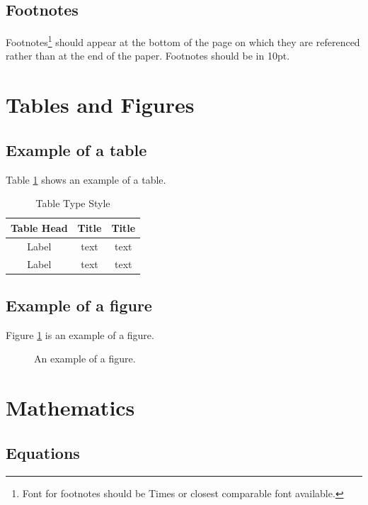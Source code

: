 \documentclass[12pt]{article}
\begin{document}
\subsection{Footnotes}

Footnotes\footnote{Font for footnotes should be Times or closest comparable font available.}
should appear at the bottom of the page on which they are referenced rather than at the end of the paper. Footnotes should be in 10pt.

\section{Tables and Figures}

\subsection{Example of a table}

Table \ref{tab1} shows an example of a table.

\begin{table}[h]
\caption{Table Type Style}
\centering
\begin{tabular}{ccc}
\hline
Table Head & Title & Title \\
\hline
Label & text & text \\
Label & text & text \\
\hline
\end{tabular}
\label{tab1}
\end{table}

\subsection{Example of a figure}

Figure \ref{fig1} is an example of a figure.

\begin{figure}[h]
\centering
{}
\caption{An example of a figure.}
\label{fig1}
\end{figure}

\section{Mathematics}

\subsection{Equations}
\end{document}
